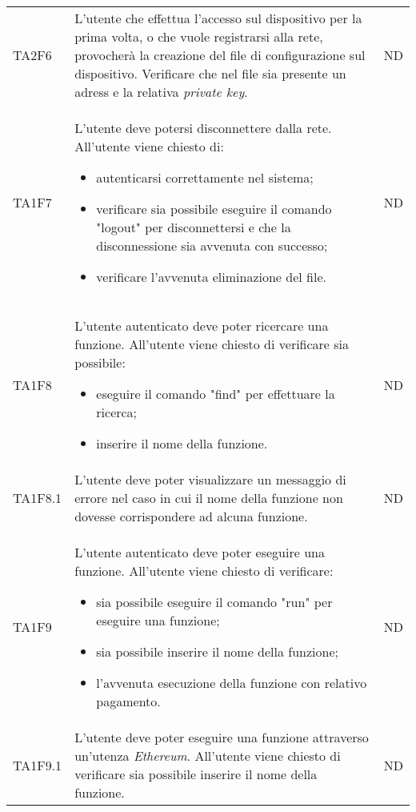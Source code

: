 \begin{longtable}{|C{1.5cm}|C{10cm}|C{1.5cm}|}
	TA2F6 &
	L'utente che effettua l'accesso sul dispositivo per la prima volta, o che vuole registrarsi alla rete, provocherà la creazione del file di configurazione sul dispositivo. Verificare che nel file sia presente un adress e la relativa \textit{private key\glo}. &
	ND \\

	TA1F7  &
	L’utente deve potersi disconnettere dalla rete. All’utente viene chiesto di:
	\begin{itemize}
		\item autenticarsi correttamente nel sistema;
		\item verificare sia possibile eseguire il comando "logout" per disconnettersi e che la disconnessione sia avvenuta con successo;
		\item verificare l'avvenuta eliminazione del file.
	\end{itemize} &
	ND \\[-5ex]

	TA1F8  &
	L’utente autenticato deve poter ricercare una funzione. All’utente viene chiesto di verificare sia possibile:
	\begin{itemize}
		\item eseguire il comando "find" per effettuare la ricerca;
		\item inserire il nome della funzione.
	\end{itemize} &
	ND \\[-5ex]

	TA1F8.1  &
	L’utente deve poter visualizzare un messaggio di errore nel caso in cui il nome della funzione non dovesse corrispondere ad alcuna funzione. &
	ND \\

	TA1F9  &
	L’utente autenticato deve poter eseguire una funzione. All’utente viene chiesto di verificare:
	\begin{itemize}
		\item sia possibile eseguire il comando "run" per eseguire una funzione;
		\item sia possibile inserire il nome della funzione;
		\item l'avvenuta esecuzione della funzione con relativo pagamento.
	\end{itemize} &
	ND \\[-5ex]

	TA1F9.1  &
	L’utente deve poter eseguire una funzione attraverso un'utenza \textit{Ethereum\glos}. All’utente viene chiesto di verificare sia possibile inserire il nome della funzione. &
	ND \\


\end{longtable}
